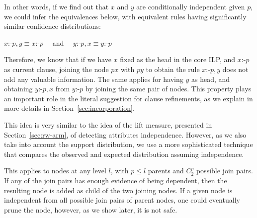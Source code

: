 In other words, if we find out that $x$ and $y$ are conditionally independent given $p$, we could infer the
equivalences below, with equivalent rules having significantly similar confidence distributions:

\begin{center}
  $x$:-$p,y \equiv x$:-$p \quad$ and  $\quad y$:-$p,x \equiv y$:-$p$
\end{center}

Therefore, we know that if we have $x$ fixed as the head in the core ILP, and $x$:-$p$ as current
clause, joining the node $px$ with $py$ to obtain the rule $x$:-$p,y$ does not add any valuable information. The same
applies for having $y$ as head, and obtaining $y$:-$p,x$ from $y$:-$p$ by joining the same pair of nodes. This
property plays an important role in the literal suggestion for clause refinements, as we explain in
more details in Section~\ref{sec:incorporation}.

This idea is very similar to the idea of the lift measure, presented in Section~\ref{sec:rw-arm}, of detecting
attributes independence. However, as we also take into account the support distribution, we use a more sophisticated
technique that compares the observed and expected distribution assuming independence.

This applies to nodes at any level $l$, with $p \leq l$ parents and $C_{2}^{p}$ possible join pairs. If any of the
join pairs has enough evidence of being dependent, then the resulting node is added as child of the two joining nodes.
If a given node is independent from all possible join pairs of parent nodes, one could eventually prune the node,
however, as we show later, it is not safe.

